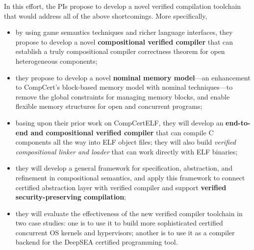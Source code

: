 \documentclass[11pt]{article}
\begin{document}
In this effort, the PIs propose to
develop a novel verified compilation toolchain that would address
all of the above shortcomings. More specifically,
\begin{itemize}
\item by using game semantics techniques and richer language interfaces,
they propose to develop a novel {\bf compositional verified compiler} that
can establish a truly compositional compiler correctness theorem for
open heterogeneous components;
\item they propose to develop a novel {\bf nominal memory model}---an
enhancement to CompCert's block-based memory model with nominal
techniques---to remove the global constraints for managing memory
blocks, and enable flexible memory structures for open and concurrent
programs;
\item basing upon their prior work on CompCertELF, they will develop an
{\bf end-to-end and compositional verified
compiler} that can compile C components all the way into ELF
object files; they will also build {\em verified compositional linker
and loader} that can work directly with ELF binaries;
\item they will develop a general
framework for specification, abstraction, and refinement in
compositional semantics, and apply this framework to connect
certified abstraction layer with verified compiler and support
{\bf verified security-preserving compilation};
\item they will evaluate the effectiveness of the new verified compiler
toolchain in two case studies: one is to use it to build more sophisticated
certified concurrent OS kernels and hypervisors; another is to
use it as a compiler backend for the DeepSEA certified programming tool.
\end{itemize}
\end{document}
